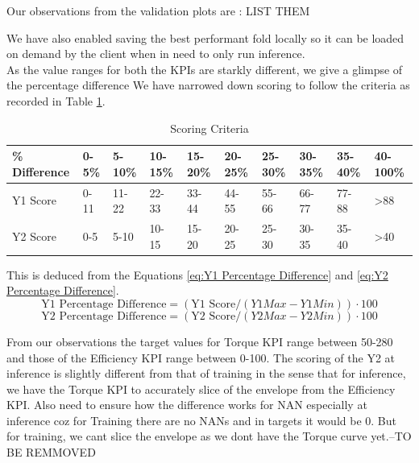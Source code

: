 \documentclass{report} %
\begin{document}
Our observations from the validation plots are : LIST THEM

We have also enabled saving the best performant fold locally so it can be loaded on demand by the client when in need to only run inference.\\
As the value ranges for both the \ac{KPI}s are starkly different, we give a glimpse of the percentage difference
We have narrowed down scoring to follow the criteria as recorded in Table \ref{tab:Scoring Criteria}.
\begin{table}[H]
    \centering
    \begin{tabularx}{1\linewidth}{|X|X|X|X|X|X|X|X|X|X|}
    \hline {\bf \% Difference} & {\bf 0-5\%} & {\bf 5-10\%} & {\bf 10-15\%} & {\bf 15-20\%} & {\bf 20-25\%} & {\bf 25-30\%} & {\bf 30-35\%} & {\bf 35-40\%} & {\bf 40-100\%}\\
    \hline 
    Y1 Score& 0-11& 11-22 & 22-33 & 33-44 & 44-55& 55-66 & 66-77 & 77-88 & \textgreater 88\\
    Y2 Score& 0-5 & 5-10 & 10-15 & 15-20 & 20-25& 25-30 & 30-35 & 35-40 &\textgreater 40\\
    \hline
    \end{tabularx}
    \caption{Scoring Criteria}
    \label{tab:Scoring Criteria}
\end{table}

This is deduced from the Equations \ref{eq:Y1 Percentage Difference} and \ref{eq:Y2 Percentage Difference}.
\begin{equation}
    \text{Y1 Percentage Difference} = (\text{Y1 Score} / {(Y1 Max - Y1 Min)})  \cdot 100
    \label{eq:Y1 Percentage Difference}
\end{equation}
\begin{equation}
    \text{Y2 Percentage Difference} = (\text{Y2 Score} / {(Y2 Max - Y2 Min)})  \cdot 100
    \label{eq:Y2 Percentage Difference}
\end{equation}

From our observations the target values for Torque \ac{KPI} range between 50-280 and those of the Efficiency \ac{KPI} range between 0-100.
The scoring of the Y2 at inference is slightly different from that of training in the sense that for inference, we have the Torque \ac{KPI} to 
accurately slice of the envelope from the Efficiency \ac{KPI}. Also need to ensure how the difference works for NAN especially at inference coz 
for Training there are no NANs and in targets it would be 0. But for training, we cant slice the envelope as we dont have the Torque curve yet.--TO BE REMMOVED
\end{document}

